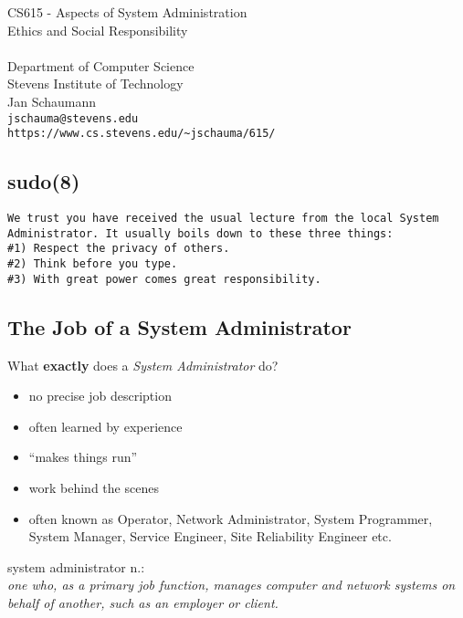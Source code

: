 \documentclass[xga]{xdvislides}
\begin{document}
\setfontphv

\lhead{\slidetitle}                               %
\cfoot{\relax}                               %
\rfoot{\Gray{\today}}

\vspace*{\fill}
\begin{center}
	\Hugesize
		CS615 - Aspects of System Administration\\ [1em]
		Ethics and Social Responsibility\\ [1em]
	\hspace*{5mm}\blueline\\ [1em]
	\Normalsize
		Department of Computer Science\\
		Stevens Institute of Technology\\
		Jan Schaumann\\
		\verb+jschauma@stevens.edu+\\
		\verb+https://www.cs.stevens.edu/~jschauma/615/+
\end{center}
\vspace*{\fill}

\subsection{sudo(8)}
\vspace*{\fill}
\begin{verbatim}
We trust you have received the usual lecture from the local System
Administrator. It usually boils down to these three things:
#1) Respect the privacy of others.
#2) Think before you type.
#3) With great power comes great responsibility.
\end{verbatim}
\vspace*{\fill}

\subsection{The Job of a System Administrator}
What {\bf exactly} does a {\em System Administrator} do?
\begin{itemize}
	\item no precise job description
	\item often learned by experience
	\item ``makes things run''
	\item work behind the scenes
	\item often known as Operator, Network Administrator, System Programmer, System
		Manager, Service Engineer, Site Reliability Engineer etc.
\end{itemize}
\vfill
system administrator n.: \\
{\em one who, as a primary job function,
	manages computer and network systems on behalf of another, such as an
	employer or client.}
\end{document}
